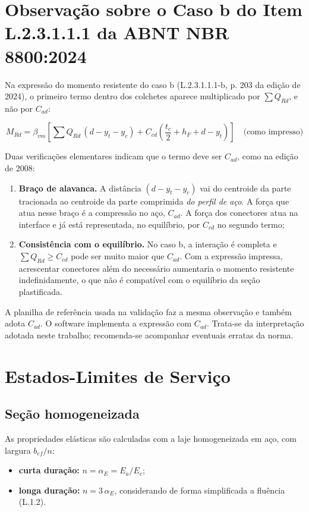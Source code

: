 \section{Observação sobre o Caso b do Item L.2.3.1.1.1 da ABNT NBR 8800:2024}\label{sec:2.7}

Na expressão do momento resistente do caso b (L.2.3.1.1.1-b, p. 203 da edição de 2024), o primeiro termo dentro dos colchetes aparece multiplicado por $\sum Q_{Rd}$, e não por $C_{ad}$:

\[
  M_{Rd} = \beta_{vm}\left[ \sum Q_{Rd}\,(d - y_t - y_c) + C_{cd}\left(\frac{t_c}{2} + h_F + d - y_t\right) \right] \quad \text{(como impresso)}
\]

Duas verificações elementares indicam que o termo deve ser $C_{ad}$, como na edição de 2008:

\begin{enumerate}
\item \textbf{Braço de alavanca.} A distância $(d - y_t - y_c)$ vai do centroide da parte tracionada ao centroide da parte comprimida \emph{do perfil de aço}. A força que atua nesse braço é a compressão no aço, $C_{ad}$. A força dos conectores atua na interface e já está representada, no equilíbrio, por $C_{cd}$ no segundo termo;
\item \textbf{Consistência com o equilíbrio.} No caso b, a interação é completa e $\sum Q_{Rd} \ge C_{cd}$ pode ser muito maior que $C_{ad}$. Com a expressão impressa, acrescentar conectores além do necessário aumentaria o momento resistente indefinidamente, o que não é compatível com o equilíbrio da seção plastificada.
\end{enumerate}

A planilha de referência usada na validação faz a mesma observação e também adota $C_{ad}$. O software implementa a expressão com $C_{ad}$. Trata-se da interpretação adotada neste trabalho; recomenda-se acompanhar eventuais erratas da norma.

\section{Estados-Limites de Serviço}\label{sec:2.8}

\subsection{Seção homogeneizada}\label{sec:2.8.1}
As propriedades elásticas são calculadas com a laje homogeneizada em aço, com largura $b_{ef}/n$:
\begin{itemize}
\item \textbf{curta duração:} $n = \alpha_E = E_a/E_c$;
\item \textbf{longa duração:} $n = 3\,\alpha_E$, considerando de forma simplificada a fluência (L.1.2).
\end{itemize}

